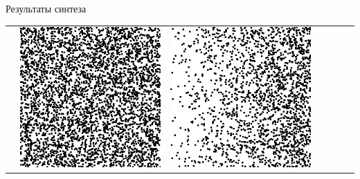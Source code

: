 \documentclass[12pt]{beamer}
\begin{document}
\begin{frame}{Результаты синтеза}
\begin{table}
\begin{center}
\begin{tabular}{p{1.2cm} p{1.2cm} p{1.2cm} p{1.2cm} p{1.2cm} p{1.2cm} p{1.2cm}}
					&
					\includegraphics[width=1\linewidth]{8-results/sand-trend8/right2}
					&
					\includegraphics[width=1\linewidth]{8-results/sand-trend8/pan2}
					&

\end{tabular}
\end{center}
\end{table}
\end{frame}
\end{document}
